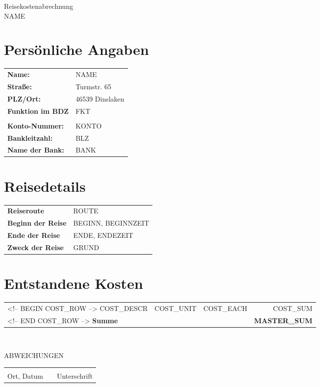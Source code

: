 \documentclass[a4paper,12pt]{article}
\begin{document}
\setlength{\parindent}{0mm}
\begin{center}
{\huge Reisekostenabrechnung}\\
{\large {NAME}} \\
\end{center}

%
\section{Persönliche Angaben}
\begin{tabular}[t]{ll}
\textbf{Name:} & {NAME} \\
\textbf{Straße:} & Turmstr. 65 \\
\textbf{PLZ/Ort:} & 46539 Dinslaken \\
\textbf{Funktion im BDZ} &  {FKT} \\
\\
\textbf{Konto-Nummer:} & {KONTO} \\
\textbf{Bankleitzahl:} & {BLZ} \\
\textbf{Name der Bank:} & {BANK} \\
\end{tabular}
\section{Reisedetails}
\begin{tabular}[t]{ll}
\textbf{Reiseroute} & {ROUTE} \\
\textbf{Beginn der Reise} & {BEGINN}, {BEGINNZEIT} \\
\textbf{Ende der Reise} & {ENDE}, {ENDEZEIT} \\
\textbf{Zweck der Reise} & {GRUND} \\
\end{tabular}
\section{Entstandene Kosten}
\begin{tabular}[t]{lrlr}
<!-- BEGIN COST_ROW -->
{COST_DESCR} & {COST_UNIT} & {COST_EACH} & {COST_SUM} \\
<!-- END COST_ROW -->
\hline
\textbf{Summe} & & & \textbf{ {MASTER_SUM}} \\
\hline
\hline
\end{tabular} \\
\vspace{1cm}

{ABWEICHUNGEN}

\vfill
\begin{tabular}{lp{4em}l}
\hspace{7cm}   && \hspace{7cm} \\
\cline{1-1}\cline{3-3}
 Ort, Datum     && Unterschrift
\end{tabular} 
\end{document}
